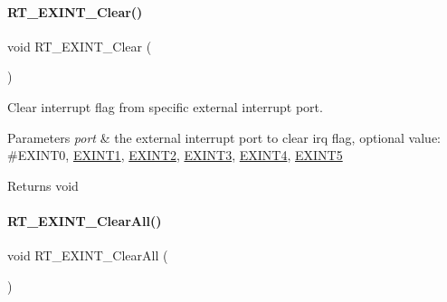\paragraph{\texorpdfstring{R\+T\+\_\+\+E\+X\+I\+N\+T\+\_\+\+Clear()}{RT\_EXINT\_Clear()}}
{\footnotesize\ttfamily void R\+T\+\_\+\+E\+X\+I\+N\+T\+\_\+\+Clear (\begin{DoxyParamCaption}\item[{port}]{ }\end{DoxyParamCaption})\hspace{0.3cm}{\ttfamily [inline]}}



Clear interrupt flag from specific external interrupt port. 


\begin{DoxyParams}{Parameters}
{\em port} & the external interrupt port to clear irq flag, optional value\+: \#\+E\+X\+I\+N\+T0, \mbox{\hyperlink{a00011_af11f5754cc92430795a63bb53d964cd4a6c87103fd7c63fc99ee4b631c0a4dac4}{E\+X\+I\+N\+T1}}, \mbox{\hyperlink{a00011_af11f5754cc92430795a63bb53d964cd4a92c5398067978d1aefd4ba3c276dec32}{E\+X\+I\+N\+T2}}, \mbox{\hyperlink{a00011_af11f5754cc92430795a63bb53d964cd4a3c37ddaa34bf4297b421d8577be06895}{E\+X\+I\+N\+T3}}, \mbox{\hyperlink{a00011_af11f5754cc92430795a63bb53d964cd4a766aca243fc0f7aa292c791202bef6e7}{E\+X\+I\+N\+T4}}, \mbox{\hyperlink{a00011_af11f5754cc92430795a63bb53d964cd4af59c814bf9818345f24bb79e7533945c}{E\+X\+I\+N\+T5}} \\
\hline
\end{DoxyParams}
\begin{DoxyReturn}{Returns}
void 
\end{DoxyReturn}
\mbox{\label{a00011_a62cc2402f1e2466bdd167cb75ad3cb74}} 
\paragraph{\texorpdfstring{R\+T\+\_\+\+E\+X\+I\+N\+T\+\_\+\+Clear\+All()}{RT\_EXINT\_ClearAll()}}
{\footnotesize\ttfamily void R\+T\+\_\+\+E\+X\+I\+N\+T\+\_\+\+Clear\+All (\begin{DoxyParamCaption}{ }\end{DoxyParamCaption})\hspace{0.3cm}{\ttfamily [inline]}}



